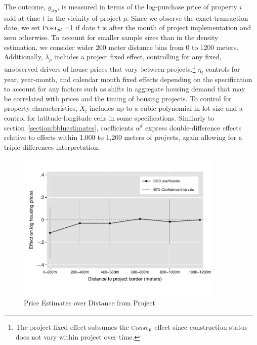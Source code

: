 \documentclass[12pt]{article}
\begin{document}
\noindent The outcome, $y_{itp}$, is measured in terms of the log-purchase price of property $i$ sold at time $t$ in the vicinity of project $p$.  Since we observe the exact transaction date, we set $\textsc{\small Post}_{pt}$\,=1 if date $t$ is after the month of project implementation and zero otherwise.  To account for smaller sample sizes than in the density estimation, we consider wider 200 meter distance bins from 0 to 1200 meters.  Additionally, $\lambda_p$ includes a project fixed effect, controlling for any fixed, unobserved drivers of house prices that vary between projects.\footnote{The project fixed effect subsumes the $\textsc{\footnotesize Const}_{p}$ effect since construction status does not vary within project over time.}  $\eta_{t}$ controls for year, year-month, and calendar month fixed effects depending on the specification to account for any factors such as shifts in aggregate housing demand that may be correlated with prices and the timing of housing projects.  To control for property characteristics, $X_i$ includes up to a cubic polynomial in lot size and a control for latitude-longitude cells in some specifications. Similarly to section~\ref{section:bbluestimates}, coefficients $\alpha^d$ express double-difference effects relative to effects within 1,000 to 1,200 meters of projects, again allowing for a triple-differences interpretation.  

\begin{figure}
\caption{Price Estimates over Distance from Project}\label{figure:distplot}
\centering
\includegraphics[width=0.9\textwidth,trim={0cm .7cm 0cm 0.7cm},clip=true]{figures/price_regs_DDDplot}
\vspace{-2mm}
\end{figure}
\end{document}
